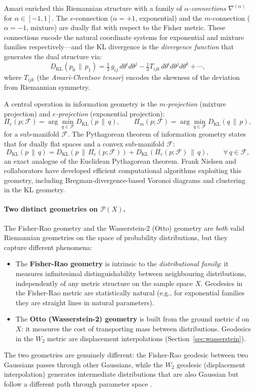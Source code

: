\documentclass[12pt]{article}
\newcommand{\KL}[2]{D_{\mathrm{KL}}\!\left(#1\,\|\,#2\right)}
\newcommand{\calP}{\mathcal{P}}
\begin{document}
Amari \citep{Amari1985,AmariNagaoka2000} enriched this Riemannian
structure with a family of \emph{$\alpha$-connections} $\nabla^{(\alpha)}$
for $\alpha \in [-1,1]$.  The $e$-connection ($\alpha = +1$,
exponential) and the $m$-connection ($\alpha = -1$, mixture) are
dually flat with respect to the Fisher metric.  These connections
encode the natural coordinate systems for exponential and mixture
families respectively---and the KL divergence is the
\emph{divergence function} that generates the dual structure via:
\[
  \KL{p_0}{p_1}
  = \tfrac{1}{2}\,g_{ij}\,d\theta^i d\theta^j
    - \tfrac{1}{3}T_{ijk}\,d\theta^i d\theta^j d\theta^k + \cdots,
\]
where $T_{ijk}$ (the \emph{Amari-Chentsov tensor}) encodes the
skewness of the deviation from Riemannian symmetry.

A central operation in information geometry is the
\emph{$m$-projection} (mixture projection) and
\emph{$e$-projection} (exponential projection):
\[
  \Pi_e(p; \mathcal{F}) = \arg\min_{q \in \mathcal{F}} \KL{p}{q},
  \qquad
  \Pi_m(p; \mathcal{F}) = \arg\min_{q \in \mathcal{F}} \KL{q}{p},
\]
for a sub-manifold $\mathcal{F}$.  The Pythagorean theorem of
information geometry states that for dually flat spaces and a
convex sub-manifold $\mathcal{F}$:
\[
  \KL{p}{q} = \KL{p}{\Pi_e(p;\mathcal{F})} + \KL{\Pi_e(p;\mathcal{F})}{q},
  \qquad \forall\, q \in \mathcal{F},
\]
an exact analogue of the Euclidean Pythagorean theorem.
Frank Nielsen and collaborators \citep{Nielsen2020,Nielsen2010}
have developed efficient computational algorithms exploiting this
geometry, including Bregman-divergence-based Voronoi diagrams and
clustering in the KL geometry.

\paragraph{Two distinct geometries on $\calP(X)$.}
The Fisher-Rao geometry and the Wasserstein-2 (Otto) geometry are
\emph{both} valid Riemannian geometries on the space of probability
distributions, but they capture different phenomena:
\begin{itemize}
  \item The \textbf{Fisher-Rao geometry} is intrinsic to the
    \emph{distributional family}: it measures infinitesimal
    distinguishability between neighbouring distributions,
    independently of any metric structure on the sample space $X$.
    Geodesics in the Fisher-Rao metric are statistically natural
    (e.g., for exponential families they are straight lines in
    natural parameters).
  \item The \textbf{Otto (Wasserstein-2) geometry} is built from
    the ground metric $d$ on $X$: it measures the cost of
    transporting mass between distributions.  Geodesics in the
    $W_2$ metric are displacement interpolations (Section~\ref{sec:wasserstein}).
\end{itemize}
The two geometries are genuinely different: the Fisher-Rao geodesic
between two Gaussians passes through other Gaussians, while the
$W_2$ geodesic (displacement interpolation) generates intermediate
distributions that are also Gaussian but follow a different path
through parameter space \citep{Villani2009}.
\end{document}
